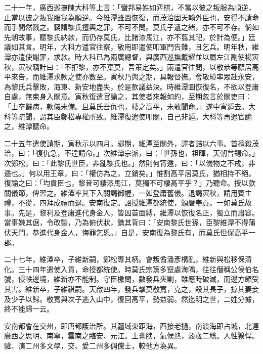 \begin{pinyinscope}
二十一年，廣西巡撫陳大科等上言：「蠻邦易姓如弈棋，不當以彼之叛服為順逆，止當以彼之叛我服我為順逆。今維潭雖圖恢復，而茂洽固天翰外臣也，安得不請命而手間然戮之。竊謂黎氏擅興之罪，不可不問。莫氏孑遺之緒，亦不可不存。倘如先朝故事，聽黎氏納款，而仍存莫氏，比諸漆馬江，亦不翦其祀，於計為便。」廷議如其言。明年，大科方遣官往察，敬用即遣使叩軍門告難，且乞兵。明年秋，維潭亦遣使謝罪，求款。時大科已為兩廣總督，與廣西巡撫戴耀並以屬左江副使楊寅秋，寅秋竊計曰：「不拒黎，亦不棄莫，吾策定矣。」兩遣官往問，以敬恭等願居高平來告，而維潭求款之使亦數至。寅秋乃與之期，具報督撫。會敬璋率眾赴永安，為黎氏兵擊敗，海東、新安地盡失，於是款議益決。時維潭圖恢復名，不欲以登庸自處，無束身入關意。寅秋復遣官諭之，其使者來報如約，至期忽言於關吏曰：「士卒饑病，款儀未備。且莫氏吾仇也，棲之高平，未敢聞命。」遂中宵遁去。大科等疏聞，謂其臣鄭松專權所致。維潭復遣使叩關，自己非遁。大科等再遣官諭之，維潭聽命。

二十五年遣使請期，寅秋示以四月。郕期，維潭至關外，譯者詰以六事。首擅殺茂洽，曰：「復仇急，不遑請命。」次維潭宗派，曰：「世孫也，祖暉，天朝曾錫命。」次鄭松，曰：「此黎氏世臣，非亂黎氏也。」然則何宵遁，曰：「以儀物之不戒，非遁也。」何以用王章，曰：「權仿為之，立銷矣。」惟割高平居莫氏，猶相持不絕。復諭之曰：「均貢臣也，黎昔可棲漆馬江，莫獨不可棲高平乎？」乃聽命。授以款關儀節，俾習之。維潭率其下入關謁御幄，一如登庸舊儀。退謁寅秋，請用賓主禮，不從，四拜成禮而退。安南復定。詔授維潭都統使，頒曆奉貢。一如莫氏故事。先是，黎利及登庸進代身金人，皆囚首面縛，維潭以恢復名正，獨立而肅容。當事嫌其倨，令改製，乃為俯伏狀，鐫其背曰：「安南黎氏世孫，臣黎維潭不得蒲伏天門，恭進代身金人，悔罪乞恩。」自是，安南復為黎氏有，而莫氏但保高平一郡。

二十七年，維潭卒，子維新嗣，鄭松專其柄。會叛酋潘彥構亂，維新與松移保清化。三十四年遣使入貢，命授都統使。時莫氏宗黨多竄處海隅，往往僭稱公侯伯名號，侵軼邊境，維新亦不能制。守臣檄問，數發兵夾剿，雖應時破滅，而邊方頗受其害。維新卒，子維祺嗣。天啟四年，發兵擊莫敬寬，克之，殺其長子，掠其妻妾及少子以歸。敬寬與次子逃入山中，復回高平，勢益弱。然迄明之世，二姓分據，終不能歸一云。

安南都會在交州，即唐都護治所。其疆域東距海，西接老撾，南渡海即占城，北連廣西之思明、南寧，雲南之臨安、元江。土膏腴，氣候熱，穀歲二稔。人性獷悍。驩、演二州多文學，交、愛二州多倜儻士，較他方為異。


\end{pinyinscope}